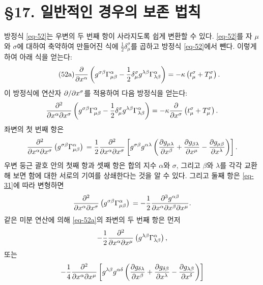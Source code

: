 \documentclass[b5paper]{article}
\begin{document}
\section*{\S 17. 일반적인 경우의 보존 법칙}
방정식 \eqref{eq-52}는 우변의 두 번째 항이 사라지도록 쉽게 변환할 수 있다. \eqref{eq-52}를 자 $\mu$와 $\sigma$에 대하여 축약하여 만들어진 식에 $\frac{1}{2}\delta_\mu^\sigma$를 곱하고 방정식 \eqref{eq-52}에서 뺀다. 이렇게 하여 아래 식을 얻는다:
\begin{equation} \tag{52a} \label{eq-52a}
	{\frac{{\partial}{}}{{\partial}{x^\alpha}}} \left( g^{\sigma\beta} \Gamma_{\mu\beta}^{\alpha}
	-\frac{1}{2} \delta_\mu^\sigma g^{\lambda\beta} \Gamma_{\lambda\beta}^{\alpha} \right)
	= -\kappa\left( t_\mu^\sigma+T_\mu^\sigma \right).
\end{equation} 
이 방정식에 연산자 ${{{\partial}{}}/{{\partial}{x^\sigma}}}$를 적용하여 다음 방정식을 얻는다:
\begin{equation*}
	{\frac{{\partial^2}{}}{{\partial}{x^\alpha}{\partial}{x^\sigma}}}\left( g^{\sigma\beta} \Gamma_{\mu\beta}^{\alpha}
	-\frac{1}{2} \delta_\mu^\sigma g^{\lambda\beta} \Gamma_{\lambda\beta}^{\alpha} \right)
	= -\kappa {\frac{{\partial}{}}{{\partial}{x^\sigma}}} \left( t_\mu^\sigma+T_\mu^\sigma \right).
\end{equation*}
좌변의 첫 번째 항은
\begin{equation*}
	{\frac{{\partial^2}{}}{{\partial}{x^\alpha}{\partial}{x^\sigma}}}\left( g^{\sigma\beta} \Gamma_{\mu\beta}^{\alpha}\right)\\
	=\frac{1}{2} {\frac{{\partial^2}{}}{{\partial}{x^\alpha}{\partial}{x^\sigma}}}\left[
		g^{\sigma\beta} g^{\alpha\lambda}\left(
			{\frac{{\partial}{g_{\mu\lambda}}}{{\partial}{x^\beta}}}
			+ {\frac{{\partial}{g_{\beta\lambda}}}{{\partial}{x^\mu}}}
			- {\frac{{\partial}{g_{\mu\beta}}}{{\partial}{x^\lambda}}}
	\right) \right].
\end{equation*}
우변 둥근 괄호 안의 첫째 항과 셋째 항은 합의 지수 $\alpha$와 $\sigma$, 그리고 $\beta$와 $\lambda$를 각각 교환해 보면 함에 대한 서로의 기여를 상쇄한다는 것을 알 수 있다. 그리고 둘째 항은 \eqref{eq-31}에 따라 변형하면
\begin{equation} \label{eq-54}
	{\frac{{\partial^2}{}}{{\partial}{x^\alpha}{\partial}{x^\sigma}}}\left( g^{\sigma\beta} \Gamma_{\mu\beta}^{\alpha}\right)\\
	=-\frac{1}{2} {\frac{{\partial^3}{g^{\alpha\beta}}}{{\partial}{x^\alpha}{\partial}{x^\beta}{\partial}{x^\mu}}}.
\end{equation}
같은 미분 연산에 의해 \eqref{eq-52a}의 좌변의 두 번째 항은 먼저
\begin{equation*}
	-\frac{1}{2}{\frac{{\partial^2}{}}{{\partial}{x^\alpha}{\partial}{x^\mu}}} \left( g^{\lambda\beta} \Gamma_{\lambda\beta}^\alpha \right),
\end{equation*}
또는
\begin{equation*}
	-\frac{1}{4}{\frac{{\partial^2}{}}{{\partial}{x^\alpha}{\partial}{x^\mu}}}\left[
		g^{\lambda\beta}g^{\alpha\delta}\left(
			{\frac{{\partial}{g_{\delta\lambda}}}{{\partial}{x^\beta}}}
			+ {\frac{{\partial}{g_{\delta\beta}}}{{\partial}{x^\lambda}}}
			- {\frac{{\partial}{g_{\lambda\beta}}}{{\partial}{x^\delta}}}
		\right)
	\right]
\end{equation*}
\end{document}
